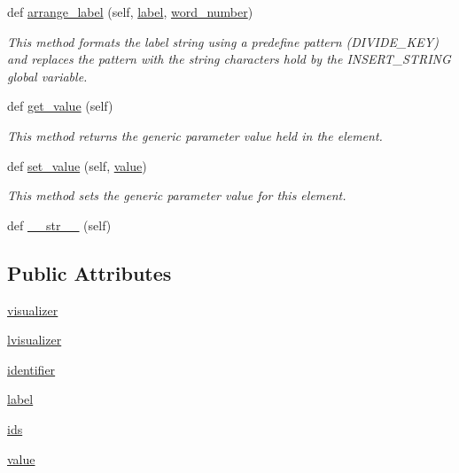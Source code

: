 \begin{DoxyCompactItemize}
def \hyperlink{class_bridges_1_1_element_1_1_element_a081734e11984d316f229254557a6795e}{arrange\+\_\+label} (self, \hyperlink{class_bridges_1_1_element_1_1_element_a2d89151a20b200117333629fa05cd4b4}{label}, \hyperlink{class_bridges_1_1_element_1_1_element_a857960f476b18de30baa18ae54877672}{word\+\_\+number})
\begin{DoxyCompactList}\small\item\em This method formats the label string using a predefine pattern (D\+I\+V\+I\+D\+E\+\_\+\+K\+E\+Y) and replaces the pattern with the string characters hold by the I\+N\+S\+E\+R\+T\+\_\+\+S\+T\+R\+I\+N\+G global variable. \end{DoxyCompactList}\item 
def \hyperlink{class_bridges_1_1_element_1_1_element_a283e6a2d0715eea745ed4cdcc8fc2ea6}{get\+\_\+value} (self)
\begin{DoxyCompactList}\small\item\em This method returns the generic parameter value held in the element. \end{DoxyCompactList}\item 
def \hyperlink{class_bridges_1_1_element_1_1_element_a25bd0c22aed9063505cca514ecd0943d}{set\+\_\+value} (self, \hyperlink{class_bridges_1_1_element_1_1_element_ae186801f92c6056c2bbec2dae153c228}{value})
\begin{DoxyCompactList}\small\item\em This method sets the generic parameter value for this element. \end{DoxyCompactList}\item 
def \hyperlink{class_bridges_1_1_element_1_1_element_a674e4f757d4874b462ce1536328ddf38}{\+\_\+\+\_\+str\+\_\+\+\_\+} (self)
\end{DoxyCompactItemize}
\subsection*{Public Attributes}
\begin{DoxyCompactItemize}
\item 
\hyperlink{class_bridges_1_1_element_1_1_element_a754c5ca67518e3c9ff6b6e7882ed05c6}{visualizer}
\item 
\hyperlink{class_bridges_1_1_element_1_1_element_a791eaed2d080d5f97e5bf95fd6c4d56a}{lvisualizer}
\item 
\hyperlink{class_bridges_1_1_element_1_1_element_a4b8f927e3404228fb3f1ddd23c25544d}{identifier}
\item 
\hyperlink{class_bridges_1_1_element_1_1_element_a301fe5be8cf72b2c62f6a218feeb9166}{label}
\item 
\hyperlink{class_bridges_1_1_element_1_1_element_a09bac6cdc3b9a08f42fde8dbe9ab7b98}{ids}
\item 
\hyperlink{class_bridges_1_1_element_1_1_element_adfe068cd72057bd5a45f71fdee2a6a91}{value}
\end{DoxyCompactItemize}
